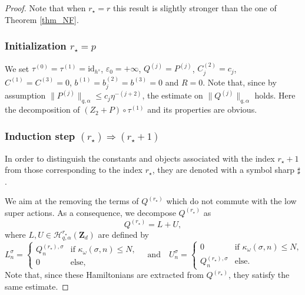 \documentclass[11pt]{article}
\theoremstyle{definition}
\begin{document}
\begin{proof}
Note that when $r_{\star}=r$ this result is slightly stronger than the one of Theorem \ref{thm_NF}.

\subsubsection*{Initialization $r_\star = p$}
We set $\tau^{(0)}=\tau^{(1)}=\mathrm{id}_{h^s}$, $\varepsilon_0= +\infty$, $Q^{(j)}=P^{(j)}$, $C_{j}^{(2)}=c_j$, $C^{(1)}=C^{(3)}=0$, $b^{(1)}=b_{j}^{(2)}=b^{(3)}=0$ and $R =0$. Note that, since by assumption $\| P^{(j)}\|_{q,\alpha} \leq c_j \eta^{-(j+2)}$, the estimate on $\| Q^{(j)}\|_{q,\alpha}$ holds. Here the decomposition of $(Z_2+P) \circ \tau^{(1)}$ and its properties are obvious.

\subsubsection*{Induction step $(r_\star) \Rightarrow (r_{\star}+1)$}
In order to distinguish the constants and objects associated with the index $r_{\star}+1$ from those corresponding to the index $r_{\star}$, they are denoted with a symbol sharp $\sharp$.

We aim at the removing the terms of $ Q^{(r_\star)}$ which do not commute with the low super actions. As a consequence, we decompose $Q^{(r_\star)}$ as
\[
Q^{(r_\star)} = L+U,
\]
where $L,U \in \mathscr{H}_{q,\alpha}^{r_\star}(\mathbf{Z}_d)$ are defined by
\[
L_n^\sigma = \begin{cases} Q^{(r_\star),\sigma}_n & \text{if } \kappa_\omega(\sigma,n) \leq N, \\
0 & \text{else},
\end{cases}
\quad\text{and} \quad U_n^\sigma = \begin{cases} 0 & \text{if } \kappa_\omega(\sigma,n) \leq N, \\
Q^{(r_\star),\sigma}_n & \text{else}.
\end{cases}
\]
Note that, since these Hamiltonians are extracted from $Q^{(r_\star)}$, they satisfy the same estimate.


\end{proof}
\end{document}
